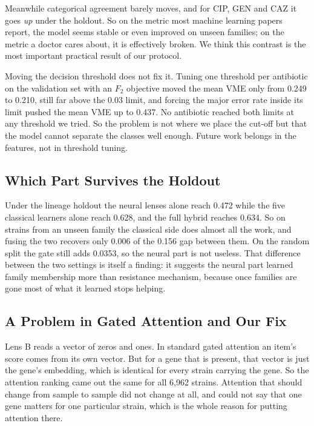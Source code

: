 \documentclass[conference]{IEEEtran}
\begin{document}
Meanwhile categorical agreement barely moves, and for CIP, GEN and CAZ it goes
\textit{up} under the holdout. So on the metric most machine learning papers report, the model seems stable or
even improved on unseen families; on the metric a doctor cares about, it is
effectively broken. We think this contrast is the most important
practical result of our protocol.

Moving the decision threshold does not fix it. Tuning one threshold per antibiotic
on the validation set with an $F_2$ objective moved the mean VME only from 0.249 to
0.210, still far above the 0.03 limit, and forcing the major error rate inside its
limit pushed the mean VME up to 0.437. No antibiotic reached both limits at any
threshold we tried. So the problem is not where we place the cut-off but that the
model cannot separate the classes well enough. Future work belongs in the features,
not in threshold tuning.

\subsection{Which Part Survives the Holdout}

Under the lineage holdout the neural lenses alone reach 0.472 while the five
classical learners alone reach 0.628, and the full hybrid reaches 0.634. So on
strains from an unseen family the classical side does almost all the work, and
fusing the two recovers only 0.006 of the 0.156 gap between them. On the random
split the gate still adds 0.0353, so the neural part is not useless. That difference
between the two settings is itself a finding: it suggests the neural part learned
family membership more than resistance mechanism, because once families are gone
most of what it learned stops helping.

\subsection{A Problem in Gated Attention and Our Fix}

Lens B reads a vector of zeros and ones. In standard gated attention an item's score
comes from its own vector. But for a gene that is present, that vector is just the
gene's embedding, which is identical for every strain carrying the gene. So the
attention ranking came out the same for all 6{,}962 strains. Attention that should
change from sample to sample did not change at all, and could not say that one gene
matters for one particular strain, which is the whole reason for putting attention
there.
\end{document}
